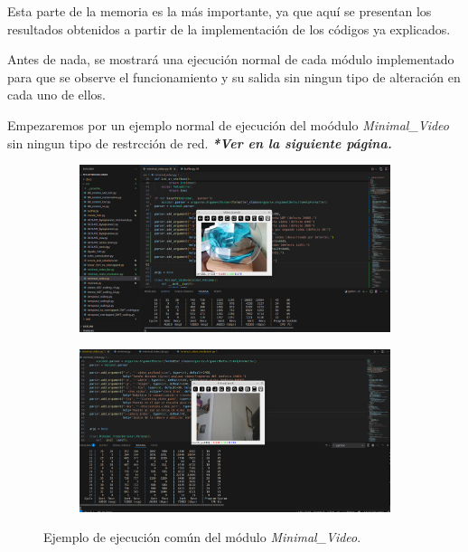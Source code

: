 \label{sec:resultados_y_discusion}

Esta parte de la memoria es la más importante, ya que aquí se presentan los resultados obtenidos a partir de la implementación de los códigos ya explicados. 
\vspace{\baselineskip}

Antes de nada, se mostrará una ejecución normal de cada módulo implementado para que se observe el funcionamiento y su salida sin ningun tipo de alteración en cada uno de ellos. 
\vspace{\baselineskip}

Empezaremos por un ejemplo normal de ejecución del moódulo \textit{Minimal\_Video} sin ningun tipo de restrcción de red. \textit{\textbf{*Ver en la siguiente página.}}
\begin{figure}[p]
  \centering
  \begin{subfigure}{\textwidth}
    \centering
    \includegraphics[width=\textwidth,height=0.6\textheight,keepaspectratio]{images/pruebas/ejecuion_normal1.png}
  \end{subfigure}
  \vspace{\baselineskip}
  \begin{subfigure}{\textwidth}
    \centering
    \includegraphics[width=\textwidth,height=0.6\textheight,keepaspectratio]{images/pruebas/ejecuion_normal2.png}
  \end{subfigure}
  \caption{Ejemplo de ejecución común del módulo \textit{Minimal\_Video}.}
  \label{fig:ejecucion_doble}
\end{figure}
\vspace{\baselineskip}
\newpage

